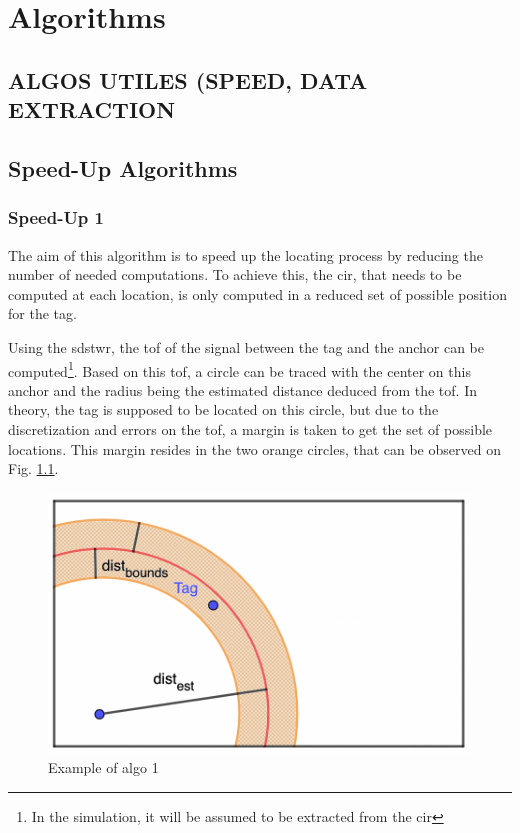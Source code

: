 \chapter{Algorithms}

\color{red}
\section{ALGOS UTILES (SPEED, DATA EXTRACTION}
\color{black}

\section{Speed-Up Algorithms}

\subsection{Speed-Up 1}

The aim of this algorithm is to speed up the locating process by reducing the number of needed computations. To achieve this, the \gls{cir}, that needs to be computed at each location, is only computed in a reduced set of possible position for the tag.
\vspace{2mm}

Using the \gls{sdstwr}, the \gls{tof} of the signal between the tag and the anchor can be computed\footnote{In the simulation, it will be assumed to be extracted from the \gls{cir}}. Based on this \gls{tof}, a circle can be traced with the center on this anchor and the radius being the estimated distance deduced from the \gls{tof}. In theory, the tag is supposed to be located on this circle, but due to the discretization and errors on the \gls{tof}, a margin is taken to get the set of possible locations. This margin resides in the two orange circles, that can be observed on Fig. \ref{fig:speedup_1}.
\vspace{2mm}

\begin{figure}[H]
\centering
\includegraphics[width=.65\linewidth]{Images/algo_1.png}
\caption{Example of algo 1}
\label{fig:speedup_1}
\end{figure}

